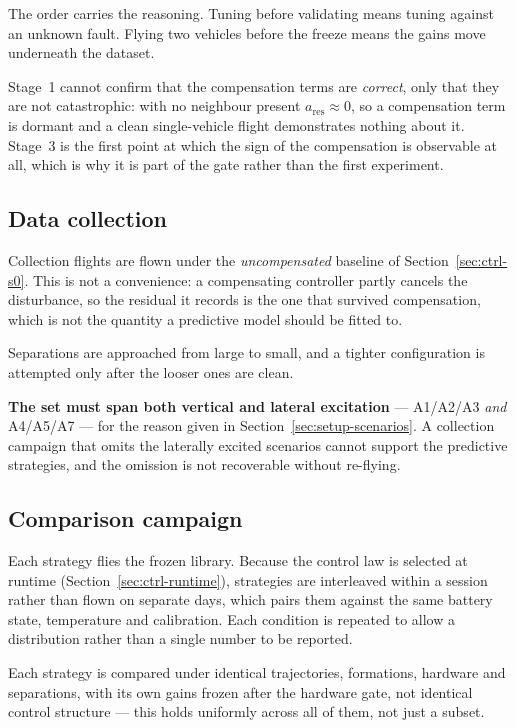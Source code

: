 The order carries the reasoning. Tuning before validating means tuning against an unknown fault.
Flying two vehicles before the freeze means the gains move underneath the dataset.

Stage~1 cannot confirm that the compensation terms are \emph{correct}, only that they are not
catastrophic: with no neighbour present $a_{\mathrm{res}} \approx 0$, so a compensation term is
dormant and a clean single-vehicle flight demonstrates nothing about it. Stage~3 is the first point
at which the sign of the compensation is observable at all, which is why it is part of the gate
rather than the first experiment.

\subsection{Data collection}
\label{sec:setup-collect}

Collection flights are flown under the \emph{uncompensated} baseline of
Section~\ref{sec:ctrl-s0}. This is not a convenience: a compensating controller partly cancels the
disturbance, so the residual it records is the one that survived compensation, which is not the
quantity a predictive model should be fitted to.

Separations are approached from large to small, and a tighter configuration is attempted only after
the looser ones are clean.

\textbf{The set must span both vertical and lateral excitation} --- A1/A2/A3 \emph{and} A4/A5/A7
--- for the reason given in Section~\ref{sec:setup-scenarios}. A collection campaign that omits the
laterally excited scenarios cannot support the predictive strategies, and the omission is not
recoverable without re-flying.

\subsection{Comparison campaign}
\label{sec:setup-campaign}

Each strategy flies the frozen library. Because the control law is selected at runtime
(Section~\ref{sec:ctrl-runtime}), strategies are interleaved within a session rather than flown on
separate days, which pairs them against the same battery state, temperature and calibration.
Each condition is repeated to allow a distribution rather than a single number to be reported.

Each strategy is compared under identical trajectories, formations, hardware and separations, with
its own gains frozen after the hardware gate, not identical control structure — this holds
uniformly across all of them, not just a subset.

